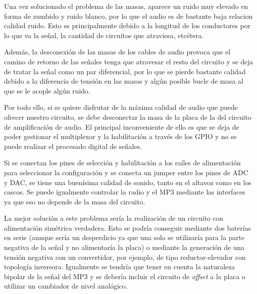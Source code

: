 Una vez solucionado el problema de las masas, aparece un ruido muy elevado en forma de zumbido y ruido blanco, por lo que el audio es de bastante baja relacion calidad ruido. Esto es principalmente debido a la longitud de los conductores por lo que va la señal, la cantidad de circuitos que atraviesa, etcétera. 

Además, la desconexión de las masas de los cables de audio provoca que el camino de retorno de las señales tenga que atravesar el resto del circuito y se deja de tratar la señal como un par diferencial, por lo que se pierde bastante calidad debido a la diferencia de tensión en las masas y algún posible bucle de masa al que se le acople algún ruido.

Por todo ello, si se quiere disfrutar de la máxima calidad de audio que puede ofrecer nuestro circuito, se debe desconectar la masa de la placa de la del circuito de amplificación de audio. El principal inconveniente de ello es que se deja de poder gestionar el multiplexor y la habilitación a través de los GPIO y no se puede realizar el procesado digital de señales.

Si se conectan los pines de selección y habilitación a los raíles de alimentación para seleccionar la configuración y se conecta un jumper entre los pines de ADC y DAC, se tiene una buenísima calidad de sonido, tanto en el altavoz como en los cascos. Se puede igualmente controlar la radio y el MP3 mediante las interfaces ya que eso no depende de la masa del circuito.

La mejor solución a este problema sería la realización de un circuito con alimentación simétrica verdadera. Esto se podría conseguir mediante dos baterías en serie (aunque sería un desperdicio ya que una solo se utilizaría para la parte negativa de la señal y no alimentaría la placa) o mediante la generación de una tensión negativa con un convertidor, por ejemplo, de tipo reductor-elevador con topología inversora. Igualmente se tendría que tener en cuenta la naturaleza bipolar de la señal del MP3 y se debería incluir el circuito de \textit{offset} a la placa o utilizar un cambiador de nivel analógico.